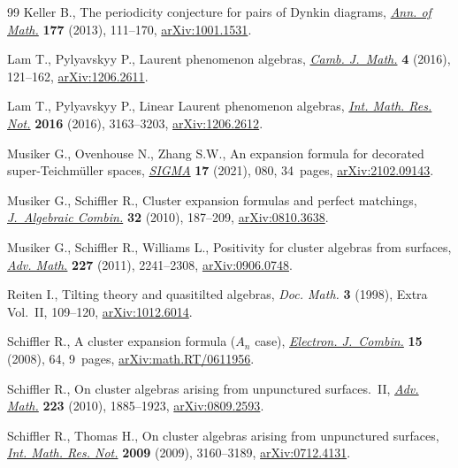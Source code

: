 \documentclass[10pt,a4paper]{amsart}
\numberwithin{equation}{section}
\begin{document}
\begin{thebibliography}{99}
Keller B., The periodicity conjecture for pairs of {D}ynkin diagrams,
 \href{https://doi.org/10.4007/annals.2013.177.1.3}{\textit{Ann. of Math.}} \textbf{177} (2013), 111--170, \href{https://arxiv.org/abs/1001.1531}{arXiv:1001.1531}.

Lam T., Pylyavskyy P., Laurent phenomenon algebras, \href{https://doi.org/10.4310/CJM.2016.v4.n1.a2}{\textit{Camb. J.~Math.}}
 \textbf{4} (2016), 121--162, \href{https://arxiv.org/abs/1206.2611}{arXiv:1206.2611}.

Lam T., Pylyavskyy P., Linear {L}aurent phenomenon algebras, \href{https://doi.org/10.1093/imrn/rnv237}{\textit{Int. Math.
 Res. Not.}} \textbf{2016} (2016), 3163--3203, \href{https://arxiv.org/abs/1206.2612}{arXiv:1206.2612}.

Musiker G., Ovenhouse N., Zhang S.W., An expansion formula for decorated
 super-{T}eichm\"uller spaces, \href{https://doi.org/10.3842/SIGMA.2021.080}{\textit{SIGMA}} \textbf{17} (2021), 080,
 34~pages, \href{https://arxiv.org/abs/2102.09143}{arXiv:2102.09143}.

Musiker G., Schiffler R., Cluster expansion formulas and perfect matchings,
 \href{https://doi.org/10.1007/s10801-009-0210-3}{\textit{J.~Algebraic Combin.}} \textbf{32} (2010), 187--209,
 \href{https://arxiv.org/abs/0810.3638}{arXiv:0810.3638}.

Musiker G., Schiffler R., Williams L., Positivity for cluster algebras from
 surfaces, \href{https://doi.org/10.1016/j.aim.2011.04.018}{\textit{Adv. Math.}} \textbf{227} (2011), 2241--2308,
 \href{https://arxiv.org/abs/0906.0748}{arXiv:0906.0748}.

Reiten I., Tilting theory and quasitilted algebras, \textit{Doc. Math.}
 \textbf{3} (1998), Extra Vol.~II, 109--120, \href{https://arxiv.org/abs/1012.6014}{arXiv:1012.6014}.

Schiffler R., A cluster expansion formula ({$A_n$} case), \href{https://doi.org/10.37236/788}{\textit{Electron.
 J.~Combin.}} \textbf{15} (2008), 64, 9~pages, \href{https://arxiv.org/abs/math.RT/0611956}{arXiv:math.RT/0611956}.

Schiffler R., On cluster algebras arising from unpunctured surfaces.~{II},
 \href{https://doi.org/10.1016/j.aim.2009.10.015}{\textit{Adv. Math.}} \textbf{223} (2010), 1885--1923, \href{https://arxiv.org/abs/0809.2593}{arXiv:0809.2593}.

Schiffler R., Thomas H., On cluster algebras arising from unpunctured surfaces,
 \href{https://doi.org/10.1093/imrn/rnp047}{\textit{Int. Math. Res. Not.}} \textbf{2009} (2009), 3160--3189,
 \href{https://arxiv.org/abs/0712.4131}{arXiv:0712.4131}.

\end{thebibliography}
\end{document}
